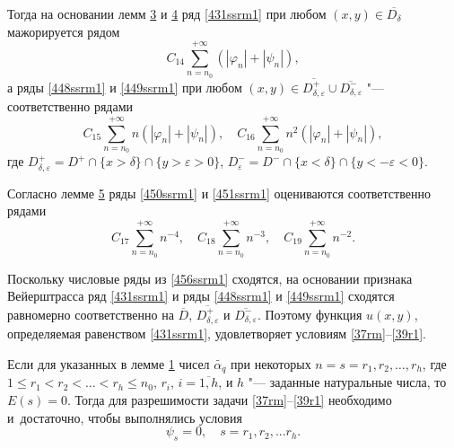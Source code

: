 Тогда на основании лемм \hyperlink{saf:lemma:3}{3} и \hyperlink{saf:lemma:4}{4} ряд \eqref{431ssrm1} при любом
$(x,y)\in \overline{D_{\delta}}$  мажорируется  рядом
\begin{equation} \label{450ssrm1}
C_{14}\sum_{n=n_{0}}^{+\infty}(|\varphi_{n}|+|\psi_{n}|),
\end{equation}
а ряды \eqref{448ssrm1} и \eqref{449ssrm1} при любом $(x,y)\in \overline{D^{+}_{\delta, \varepsilon}}\cup \overline{D^{-}_{\delta, \varepsilon}}$
"--- соответственно рядами
 \begin{equation} \label{451ssrm1}
C_{15}\sum_{n=n_{0}}^{+\infty}n (|\varphi_{n}|+|\psi_{n}|),
\quad 
C_{16}\sum_{n=n_{0}}^{+\infty}n^2 (|\varphi_{n}|+|\psi_{n}|),
 \end{equation}
где $D^{+}_{\delta, \varepsilon}=D^{+}\cap \{x>\delta\}\cap \{y>\varepsilon>0\}$, $D^{-}_{
\varepsilon}=D^{-}\cap \{x<\delta\}\cap\{y<-\varepsilon<0\}$.

Согласно лемме \hyperlink{saf:lemma:5}{5} ряды \eqref{450ssrm1} и \eqref{451ssrm1} оцениваются соответственно рядами
\begin{equation} \label{456ssrm1} 
C_{17}\sum_{n=n_{0}}^{+\infty}n^{-4},  \quad 
C_{18}\sum_{n=n_{0}}^{+\infty}n^{-3},  \quad 
C_{19}\sum_{n=n_{0}}^{+\infty}n^{-2}.
\end{equation}


Поскольку числовые ряды из \eqref{456ssrm1} сходятся, на основании признака Вейерштрасса ряд \eqref{431ssrm1} и ряды \eqref{448ssrm1} и \eqref{449ssrm1} сходятся равномерно соответственно на $\overline{D}$, $\overline{D^{+}_{\delta, \varepsilon}}$ и $\overline{D^{-}_{\delta, \varepsilon}}$. 
Поэтому функция $u(x,y)$, определяемая равенством \eqref{431ssrm1}, удовлетворяет условиям \eqref{37rm}--\eqref{39r1}.

Если для указанных в лемме  \hyperlink{saf:lemma:1}{1} чисел $\widetilde{\alpha_{q}}$ при некоторых $n\!=\!s\!=\!r_{1}, r_{2}, \dots, r_{h}$, где $1\leq r_{1}<r_{2}<\dots <r_{h}\leq n_{0}$, $r_{i}$, $i=\overline{1,h}$, и $h$ "--- заданные натуральные числа, то $E(s)=0$. 
Тогда для разрешимости задачи \eqref{37rm}--\eqref{39r1} необходимо и~достаточно, чтобы выполнялись условия
\begin{equation}
\label{457ssrm1}  \psi_{s}=0,  \quad  s=r_{1}, r_{2}, ... r_{h}.
\end{equation}

